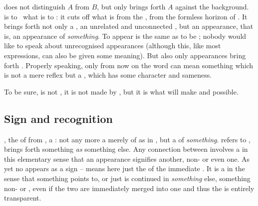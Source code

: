  does not distinguish $A$ from $B$, but only brings forth
$A$ against the  background.  is to \pexp\ what
 is to : it {cuts} off what is
 from the , from the formless horizon of \pexp. It
brings forth not only a , an unrelated and unconnected
, but an appearance, that is, an appearance of {\em something}.
To appear is the same as to be ; nobody would like to speak about
unrecognised appearances (although this, like most expressions, can also be
given some meaning). But also only appearances bring forth .
Properly speaking, only from now on the word  can mean something
which is not a mere reflex but a , which has some character and
sameness.

To be sure,  is not , it is not made by ,
but it is what will make  and  possible.


\subsection{Sign and recognition}
\pa\label{pa:signB} , the  of  from
,  a : not any more a merely 
 of  as in , but a 
of {\em something}.   refers  to
, brings forth something  {\em as} something
else.  Any connection between  involves a  in this
elementary sense that an  appearance signifies another,
non- or even  one.
As yet no  appears as a sign --  means 
here just the  of the immediate . It is a  in
the sense that something  points to, or just is continued in {\em
  something} else, something non- or , even if the two
are immediately 
merged into one and thus the  is entirely transparent.

